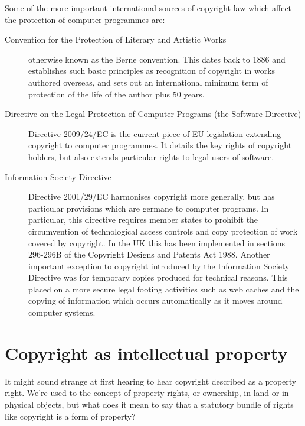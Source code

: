 \documentclass[a4paper,12pt]{article}
\begin{document}
Some of the more important international sources of copyright law which
affect the protection of computer programmes are:
\begin{description}
  \item[Convention for the Protection of Literary and Artistic Works]
    otherwise known as the Berne convention. This dates back to 1886 and
    establishes such basic principles as recognition of copyright in works
    authored overseas, and sets out an international minimum term of
    protection of the life of the author plus 50 years.
  \item[Directive on the Legal Protection of Computer Programs (the Software
    Directive)] Directive
    2009/24/EC  is the current piece of EU legislation
    extending copyright to computer programmes. It details the key rights of
    copyright holders, but also extends particular rights to legal users of
    software.
  \item[Information Society Directive] Directive 2001/29/EC harmonises 
    copyright more generally, but has particular provisions which are
    germane to computer programs. In particular, this directive requires
    member states to prohibit the circumvention of technological access
    controls and copy protection of work covered by copyright. In the UK
    this has been implemented in sections 296-296B of the Copyright Designs
    and Patents Act 1988. Another important exception to copyright
    introduced by the Information Society Directive was for temporary copies
    produced for technical reasons. This placed on a more secure legal
    footing activities such as web caches and the copying of information
    which occurs automatically as it moves around computer systems.
\end{description}

\section{Copyright as intellectual property}

It might sound strange at first hearing to hear copyright described as a
property right. We're used to the concept of property rights, or ownership,
in land or in physical objects, but what does it mean to say that a
statutory bundle of rights like copyright is a form of property? 
\end{document}
